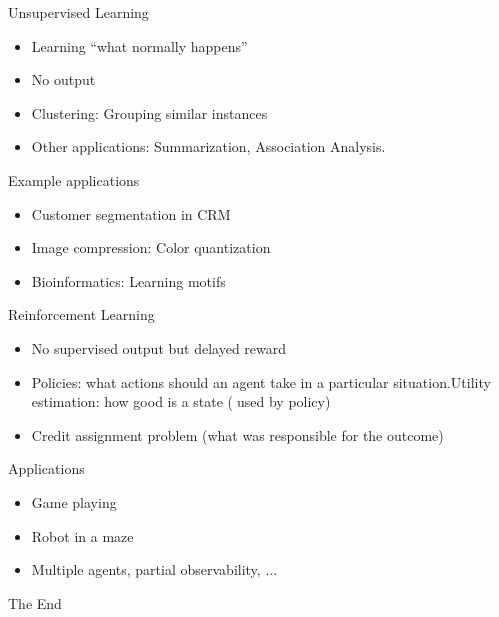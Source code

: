 \documentclass{beamer}
\begin{document}
\begin{frame}{Unsupervised Learning}
    \begin{itemize}
        \item Learning “what normally happens”
\item No output
\item Clustering: Grouping similar instances
\item Other applications: Summarization, Association Analysis. \end{itemize}
\begin{block}{Example applications}
\begin{itemize}
    \item Customer segmentation in CRM
\item Image compression: Color quantization
\item Bioinformatics: Learning motifs
\end{itemize}
\end{block}
\end{frame}

\begin{frame}{Reinforcement Learning}
    \begin{itemize}
        \item No supervised output but delayed reward
        \item Policies: what actions should an agent take in a particular situation.Utility estimation: how good is a state (used by policy)
        \item Credit assignment problem (what was responsible for the outcome) 
     \end{itemize}
     \begin{block}{Applications}
     \begin{itemize}
        \item Game playing
        \item Robot in a maze
        \item Multiple agents, partial observability, ...
     \end{itemize}
     \end{block}
   \end{frame}

\begin{frame}
\huge{\centerline{The End}}
\end{frame}
\end{document}
